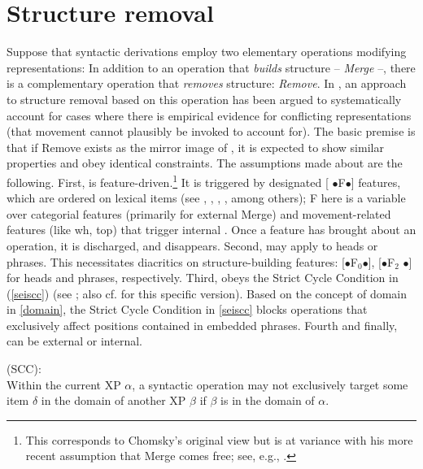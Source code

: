 \documentclass[output=paper]{langsci/langscibook}
\begin{document}
\section{Structure removal}\label{sec:32.3}

Suppose that syntactic derivations employ two elementary operations modifying
representations: In addition to an operation that {\it builds} structure --
{\it Merge} \parencite{Chomsky2001,Chomsky2008,Chomsky2013} --, there is a
complementary operation that {\it removes} structure: {\it Remove}. In
\cite{Mueller:16:sho,Mueller:17:fdm,Mueller:17:pre}, an approach to structure
removal based on this operation has been argued to systematically account for
cases where there is empirical evidence for conflicting representations (that
movement cannot plausibly be invoked to account for). The basic premise is that
if Remove exists as the mirror image of , it is expected to show
similar properties and obey identical constraints. The assumptions made about
 are the following. First,  is
feature-driven.\footnote{This corresponds to Chomsky's original view but is at
    variance with his more recent assumption that Merge comes free; see, e.g.,
    \textcite{Chomsky2013}.} It is triggered by designated [{\small
    $\bullet$}F{\small $\bullet$}] features, which are ordered on lexical items
(see \citealt{Heck&Mueller:07:elow}, \citealt{Abels2012}, \citealt{Stabler:14},
\citealt{Georgi:14}, among others); F here is a variable over categorial
features (primarily for external Merge) and movement-related features (like wh,
top) that trigger internal .  Once a feature has brought about an
operation, it is discharged, and disappears.  Second,  may apply to
heads or phrases. This necessitates diacritics on structure-building features:
[{\small $\bullet$}F$_0${\small $\bullet$}], [{\small $\bullet$}F$_2${\small
$\bullet$}] for heads and phrases, respectively.  Third,  obeys the
Strict Cycle Condition in (\ref{seiscc}) (see
\citealt{Chomsky1973,Chomsky:95,Chomsky2001,Chomsky2008}; also cf.
\citealt{Safir:10,Safir:15} for this specific version). Based on the concept of
domain in \eqref{domain}, the Strict Cycle Condition in \eqref{seiscc} blocks
operations that exclusively affect positions contained in embedded phrases.
Fourth and finally,  can be external or internal.

 (SCC):\\ Within \label{scc}the
current XP $\alpha$, a syntactic operation may not exclusively target some
item $\delta$ in the domain of another XP $\beta$ if $\beta$ is in the domain
of $\alpha$.
\z
\end{document}
